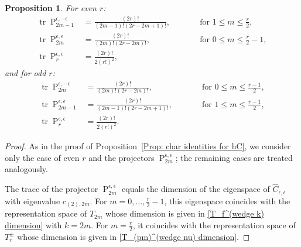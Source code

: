 \documentclass[a4paper]{article}
\newcommand{\hC}{\widehat{C}}
\renewcommand{\=}{\ =\ }
\DeclareMathOperator{\proj}{P}
\DeclareMathOperator{\tr}{tr}
\numberwithin{equation}{section}
\newtheorem{proposition}{Proposition}
\theoremstyle{remark}
\begin{document}
\begin{proposition}\label{Prop: traces for projectors}
For even $r$:
\begin{equation}\label{projectors traces for even nu}
\begin{aligned}
\tr \proj_{2m-1}^{\epsilon,-\epsilon}
&=\frac{(2r)!}{(2m-1)!(2r-2m+1)!},
&\qquad &\text{for } 1\le m\le \frac{r}{2},\\
\tr \proj_{2m}^{\epsilon,\epsilon}
&=\frac{(2r)!}{(2m)!(2r-2m)!},
&\qquad &\text{for } 0\le m\le\frac{r}{2}-1,\\
\tr \proj_{r}^{\epsilon,\epsilon}
&=\frac{(2r)!}{2(r!)^2},
\end{aligned}
\end{equation}
and for odd $r$:
\begin{equation}\label{projectors traces for odd nu}
\begin{aligned}
\tr \proj_{2m}^{\epsilon,-\epsilon}
&=\frac{(2r)!}{(2m)!(2r-2m)!},
&\qquad &\text{for } 0\le m\le\frac{r-1}{2},\\
\tr \proj_{2m-1}^{\epsilon,\epsilon}
&=\frac{(2r)!}{(2m-1)!(2r-2m+1)!},
&\qquad &\text{for } 1\le m \le \frac{r-1}{2},\\
\tr \proj_{r}^{\epsilon,\epsilon}
&=\frac{(2r)!}{2(r!)^2}.
\end{aligned}
\end{equation}
\end{proposition}

\begin{proof}
As in the proof of Proposition~\ref{Prop: char identities for hC}, we consider only the case of even $r$ and the projectors $\proj_{2m}^{\epsilon,\epsilon}$; the remaining cases are treated analogously.

The trace of the projector $\proj_{2m}^{\epsilon,\epsilon}$ equals the dimension of the eigenspace of $\hC_{\epsilon,\epsilon}$ with eigenvalue $c_{(2),2m}$. For $m=0,\dots,\frac{r}{2}-1$, this eigenspace coincides with the representation space of $T_{2m}$ whose dimension is given in \eqref{T_f^(wedge k) dimension} with $k=2m$. For $m=\frac{r}{2}$, it coincides with the representation space of $T_r^\pm$ whose dimension is given in \eqref{T_(pm)^(wedge nu) dimension}.
\end{proof}
\end{document}

